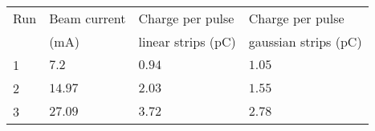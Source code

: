 \begin{table}[!h]
  \centering
  \caption[]{}
  \label{chap4:tab:limit}
  \begin{tabularx}{1\textwidth}{lXXX}
    \toprule
    Run & Beam current    & Charge per pulse              & Charge per pulse                \\
        & ($\mathrm{mA}$) & linear strips ($\mathrm{pC}$) & gaussian strips ($\mathrm{pC}$) \\
    \midrule
    1   & $7.2$           & $0.94$                        & $1.05$                          \\
    2   & $14.97$         & $2.03$                        & $1.55$                          \\
    3   & $27.09$         & $3.72$                        & $2.78$                          \\

    \bottomrule
  \end{tabularx}
\end{table}